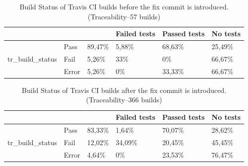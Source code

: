\documentclass[10pt,conference]{IEEEtran}
\begin{document}
\begin{table}[t]
\centering
\begin{tabular}{lll|lll}
\hline
\multicolumn{3}{l|}{}                                & Failed tests & Passed tests & No tests \\ \hline
\multirow{3}{*}{tr\_build\_status} & Pass  & 89,47\% & 5,88\%       & 68,63\%      & 25,49\%  \\
                                   & Fail  & 5,26\%  & 33\%         & 0\%          & 66,67\%  \\
                                   & Error & 5,26\%  & 0\%          & 33,33\%      & 66,67\%  \\ \hline
\end{tabular}
\label{tab:beforefix}
\caption{Build Status of Travis CI builds before the fix commit is introduced. \\ (Traceability--57 builds)}
\end{table}

\begin{table}[t]
\centering
\begin{tabular}{lll|lll}
\hline
\multicolumn{3}{l|}{}                                & Failed tests & Passed tests & No tests \\ \hline
\multirow{3}{*}{tr\_build\_status} & Pass  & 83,33\% & 1,64\%       & 70,07\%      & 28,62\%  \\
                                   & Fail  & 12,02\% & 34,09\%      & 20,45\%      & 45,45\%  \\
                                   & Error & 4,64\%  & 0\%          & 23,53\%      & 76,47\%  \\ \hline
\end{tabular}
\label{tab:afterfix}
\caption{Build Status of Travis CI builds after the fix commit is introduced. \\ (Traceability--366 builds)}
\end{table}
\end{document}
